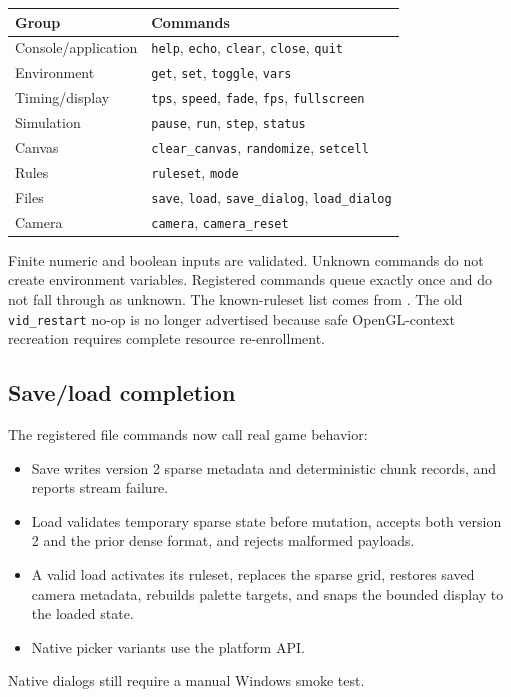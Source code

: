\begin{table}[h]
\centering
\small
\begin{tabularx}{\linewidth}{@{}l X@{}}
\toprule
\textbf{Group} & \textbf{Commands} \\
\midrule
Console/application & \texttt{help}, \texttt{echo}, \texttt{clear}, \texttt{close}, \texttt{quit} \\
Environment & \texttt{get}, \texttt{set}, \texttt{toggle}, \texttt{vars} \\
Timing/display & \texttt{tps}, \texttt{speed}, \texttt{fade}, \texttt{fps}, \texttt{fullscreen} \\
Simulation & \texttt{pause}, \texttt{run}, \texttt{step}, \texttt{status} \\
Canvas & \texttt{clear\_canvas}, \texttt{randomize}, \texttt{setcell} \\
Rules & \texttt{ruleset}, \texttt{mode} \\
Files & \texttt{save}, \texttt{load}, \texttt{save\_dialog}, \texttt{load\_dialog} \\
Camera & \texttt{camera}, \texttt{camera\_reset} \\
\bottomrule
\end{tabularx}
\end{table}

Finite numeric and boolean inputs are validated. Unknown commands do not create
environment variables. Registered commands queue exactly once and do not fall
through as unknown. The known-ruleset list comes from .
The old \texttt{vid\_restart} no-op is no longer advertised because safe
OpenGL-context recreation requires complete resource re-enrollment.

\subsection{Save/load completion}

The registered file commands now call real game behavior:
\begin{itemize}
  \item Save writes version 2 sparse metadata and deterministic chunk records,
        and reports stream failure.
  \item Load validates temporary sparse state before mutation, accepts both
        version 2 and the prior dense format, and rejects malformed payloads.
  \item A valid load activates its ruleset, replaces the sparse grid, restores
        saved camera metadata, rebuilds palette targets, and snaps the bounded
        display to the loaded state.
  \item Native picker variants use the platform  API.
\end{itemize}
Native dialogs still require a manual Windows smoke test.

